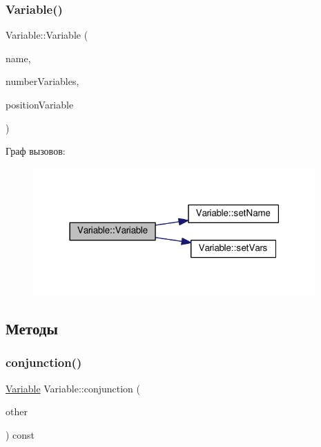 \subsubsection{\texorpdfstring{Variable()}{Variable()}\hspace{0.1cm}{\footnotesize\ttfamily [4/4]}}
{\footnotesize\ttfamily Variable\+::\+Variable (\begin{DoxyParamCaption}\item[{Q\+Char}]{name,  }\item[{int}]{number\+Variables,  }\item[{int}]{position\+Variable }\end{DoxyParamCaption})}

Граф вызовов\+:\nopagebreak
\begin{figure}[H]
\begin{center}
\leavevmode
\includegraphics[width=307pt]{class_variable_af55f1231f40b8fc1bb6fbca091a43c83_cgraph}
\end{center}
\end{figure}


\subsection{Методы}
\mbox{\label{class_variable_a3072441748b17a105aea1485911bb489}} 
\subsubsection{\texorpdfstring{conjunction()}{conjunction()}}
{\footnotesize\ttfamily \hyperlink{class_variable}{Variable} Variable\+::conjunction (\begin{DoxyParamCaption}\item[{const \hyperlink{class_variable}{Variable} \&}]{other }\end{DoxyParamCaption}) const}



